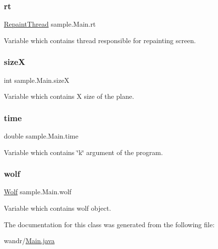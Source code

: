 \subsubsection{\texorpdfstring{rt}{rt}}
{\footnotesize\ttfamily \hyperlink{classsample_1_1_repaint_thread}{Repaint\+Thread} sample.\+Main.\+rt}

Variable which contains thread responsible for repainting screen. \mbox{\label{classsample_1_1_main_ae1a64fcdcc58b34ad0fc433328dd2470}} 
\subsubsection{\texorpdfstring{sizeX}{sizeX}}
{\footnotesize\ttfamily int sample.\+Main.\+sizeX}

Variable which contains X size of the plane. \mbox{\label{classsample_1_1_main_ab8abfee15ab924585e78d876b3b36f15}} 
\subsubsection{\texorpdfstring{time}{time}}
{\footnotesize\ttfamily double sample.\+Main.\+time}

Variable which contains \char`\"{}k\char`\"{} argument of the program. \mbox{\label{classsample_1_1_main_ad107bdae7a63af044e8504ecbe14f8cf}} 
\subsubsection{\texorpdfstring{wolf}{wolf}}
{\footnotesize\ttfamily \hyperlink{classsample_1_1_wolf}{Wolf} sample.\+Main.\+wolf}

Variable which contains wolf object. 

The documentation for this class was generated from the following file\+:\begin{DoxyCompactItemize}
\item 
wandr/\hyperlink{_main_8java}{Main.\+java}\end{DoxyCompactItemize}
